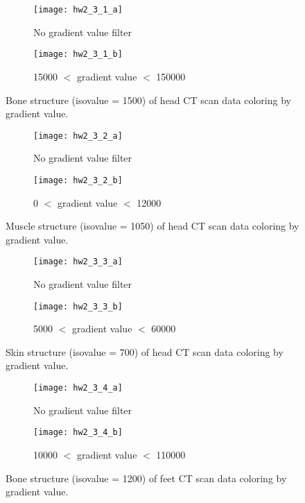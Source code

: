 \documentclass[11pt]{article}
\begin{document}
\begin{figure}[H]
\begin{subfigure}{.5\textwidth}
  \centering
  \texttt{[image: hw2\_3\_1\_a]}
  \caption{No gradient value filter}
  \label{fig:hw2_3_1_a}
\end{subfigure}
\begin{subfigure}{.5\textwidth}
  \centering
  \texttt{[image: hw2\_3\_1\_b]}
  \caption{15000 $<$ gradient value $<$ 150000}
  \label{fig:hw2_3_1_b}
\end{subfigure}
\caption{Bone structure (isovalue = 1500) of head CT scan data coloring by gradient value.}
\end{figure}

\begin{figure}[H]
\begin{subfigure}{.5\textwidth}
  \centering
  \texttt{[image: hw2\_3\_2\_a]}
  \caption{No gradient value filter}
  \label{fig:hw2_3_2_a}
\end{subfigure}
\begin{subfigure}{.5\textwidth}
  \centering
  \texttt{[image: hw2\_3\_2\_b]}
  \caption{0 $<$ gradient value $<$ 12000}
  \label{fig:hw2_3_2_b}
\end{subfigure}
\caption{Muscle structure (isovalue = 1050) of head CT scan data coloring by gradient value.}
\end{figure}

\begin{figure}[H]
\begin{subfigure}{.5\textwidth}
  \centering
  \texttt{[image: hw2\_3\_3\_a]}
  \caption{No gradient value filter}
  \label{fig:hw2_3_3_a}
\end{subfigure}
\begin{subfigure}{.5\textwidth}
  \centering
  \texttt{[image: hw2\_3\_3\_b]}
  \caption{5000 $<$ gradient value $<$ 60000}
  \label{fig:hw2_3_3_b}
\end{subfigure}
\caption{Skin structure (isovalue = 700) of head CT scan data coloring by gradient value.}
\end{figure}

\begin{figure}[H]
\begin{subfigure}{.5\textwidth}
  \centering
  \texttt{[image: hw2\_3\_4\_a]}
  \caption{No gradient value filter}
  \label{fig:hw2_3_4_a}
\end{subfigure}
\begin{subfigure}{.5\textwidth}
  \centering
  \texttt{[image: hw2\_3\_4\_b]}
  \caption{10000 $<$ gradient value $<$ 110000}
  \label{fig:hw2_3_4_b}
\end{subfigure}
\caption{Bone structure (isovalue = 1200) of feet CT scan data coloring by gradient value.}
\end{figure}
\end{document}
